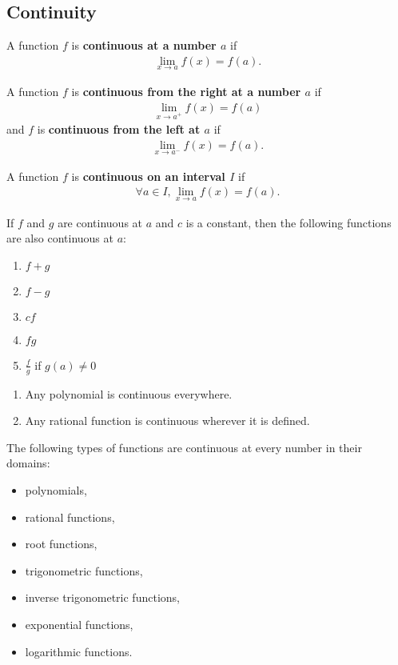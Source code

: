 \documentclass{article}
\begin{document}
\subsection{Continuity}
\begin{definition}
    A function $f$ is \textbf{continuous at a number $a$} if
    \begin{align*}
        \lim_{x\to a}f(x)=f(a).
    \end{align*}
\end{definition}
\begin{definition}
    A function $f$ is \textbf{continuous from the right at a number $a$} if
    \begin{align*}
        \lim_{x\to a^+}f(x) = f(a)
    \end{align*}
    and $f$ is \textbf{continuous from the left at $a$} if
    \begin{align*}
        \lim_{x\to a^-}f(x) = f(a).
    \end{align*}
\end{definition}
\begin{definition}
    A function $f$ is \textbf{continuous on an interval $I$} if
    \begin{align*}
        \forall a \in I, \lim_{x\to a}f(x) = f(a).
    \end{align*}
\end{definition}
\begin{theorem}
    If $f$ and $g$ are continuous at $a$ and $c$ is a constant, then the following functions are also continuous at $a$:
    \begin{enumerate}
        \item $f+g$
        \item $f-g$
        \item $cf$
        \item $fg$
        \item $\frac{f}{g}$ if $g(a)\not= 0$
    \end{enumerate}
\end{theorem}
\begin{theorem}
    \begin{enumerate}
        \item Any polynomial is continuous everywhere.
        \item Any rational function is continuous wherever it is defined.
    \end{enumerate}
\end{theorem}
\begin{theorem}
    The following types of functions are continuous at every number in their domains:
    \begin{itemize}
        \item polynomials,
        \item rational functions,
        \item root functions,
        \item trigonometric functions,
        \item inverse trigonometric functions,
        \item exponential functions,
        \item logarithmic functions.
    \end{itemize}
\end{theorem}
\end{document}
